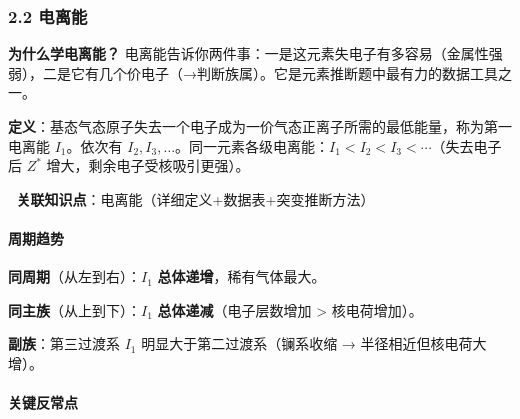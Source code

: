 \documentclass[a4paper,11pt]{ctexart}
\begin{document}
\subsubsection{2.2 电离能}\label{ux7535ux79bbux80fd}

\textbf{为什么学电离能？} 电离能告诉你两件事：一是这元素失电子有多容易（金属性强弱），二是它有几个价电子（→判断族属）。它是元素推断题中最有力的数据工具之一。

\textbf{定义}：基态气态原子失去一个电子成为一价气态正离子所需的最低能量，称为第一电离能 \(I_1\)。依次有 \(I_2, I_3, \dots\)。同一元素各级电离能：\(I_1 < I_2 < I_3 < \cdots\)（失去电子后 \(Z^*\) 增大，剩余电子受核吸引更强）。

🔗 \textbf{关联知识点}：电离能（详细定义+数据表+突变推断方法）

\paragraph{周期趋势}\label{ux5468ux671fux8d8bux52bf}

\textbf{同周期}（从左到右）：\(I_1\) \textbf{总体递增}，稀有气体最大。

\textbf{同主族}（从上到下）：\(I_1\) \textbf{总体递减}（电子层数增加 \textgreater{} 核电荷增加）。

\textbf{副族}：第三过渡系 \(I_1\) 明显大于第二过渡系（镧系收缩 → 半径相近但核电荷大增）。

\paragraph{关键反常点}\label{ux5173ux952eux53cdux5e38ux70b9}
\end{document}

